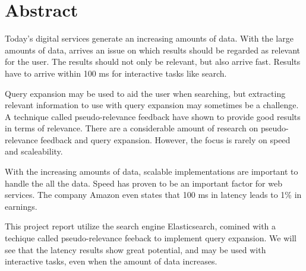 \chapter*{Abstract}
Today's digital services generate an increasing amounts of data.
With the large amounts of data, arrives an issue on which results should be regarded as relevant for the user.
The results should not only be relevant, but also arrive fast.
Results have to arrive within 100 ms for interactive tasks like search.

Query expansion may be used to aid the user when searching,
but extracting relevant information to use with query expansion may sometimes be a challenge.
A technique called pseudo-relevance feedback have shown to provide good results in terms of relevance.
There are a considerable amount of research on pseudo-relevance feedback and query expansion.
However, the focus is rarely on speed and scaleability.

With the increasing amounts of data, scalable implementations are important to handle the all the data.
Speed has proven to be an important factor for web services.
The company Amazon even states that 100 ms in latency leads to 1\% in earnings.

This project report utilize the search engine Elasticsearch,
comined with a techique called pseudo-relevance feeback to implement query expansion.
We will see that the latency results show great potential, and may be used with interactive tasks,
even when the amount of data increases.
